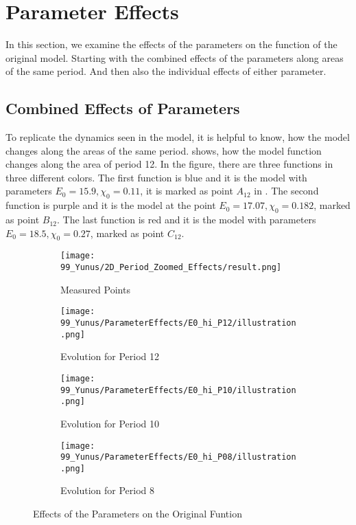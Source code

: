 \section{Parameter Effects}
\label{sec:yunus.param.effects}

In this section, we examine the effects of the parameters on the function of the original model.
Starting with the combined effects of the parameters along areas of the same period.
And then also the individual effects of either parameter.

\subsection{Combined Effects of Parameters}
\label{sec:yunus.param.effects.combined}

To replicate the dynamics seen in the model, it is helpful to know, how the model changes along the areas of the same period.
 shows, how the model function changes along the area of period 12.
In the figure, there are three functions in three different colors.
The first function is blue and it is the model with parameters $E_0 = 15.9, \chi_0 = 0.11$, it is marked as point $A_12$ in .
The second function is purple and it is the model at the point $E_0 = 17.07, \chi_0 = 0.182$, marked as point $B_{12}$.
The last function is red and it is the model with parameters $E_0 = 18.5, \chi_0 = 0.27$, marked as point $C_{12}$.

\begin{figure}
    \centering
    \begin{subfigure}{0.4\textwidth}
        \texttt{[image: 99\_Yunus/2D\_Period\_Zoomed\_Effects/result.png]}
        \caption{Measured Points}
        \label{fig:yunus.function.evolution.map}
    \end{subfigure}
    \begin{subfigure}{0.4\textwidth}
        \texttt{[image: 99\_Yunus/ParameterEffects/E0\_hi\_P12/illustration.png]}
        \caption{Evolution for Period 12}
        \label{fig:yunus.function.evolution.12}
    \end{subfigure}
    \begin{subfigure}{0.4\textwidth}
        \texttt{[image: 99\_Yunus/ParameterEffects/E0\_hi\_P10/illustration.png]}
        \caption{Evolution for Period 10}
        \label{fig:yunus.function.evolution.10}
    \end{subfigure}
    \begin{subfigure}{0.4\textwidth}
        \texttt{[image: 99\_Yunus/ParameterEffects/E0\_hi\_P08/illustration.png]}
        \caption{Evolution for Period 8}
        \label{fig:yunus.function.evolution.08}
    \end{subfigure}
    \caption{Effects of the Parameters on the Original Funtion}
\end{figure}

